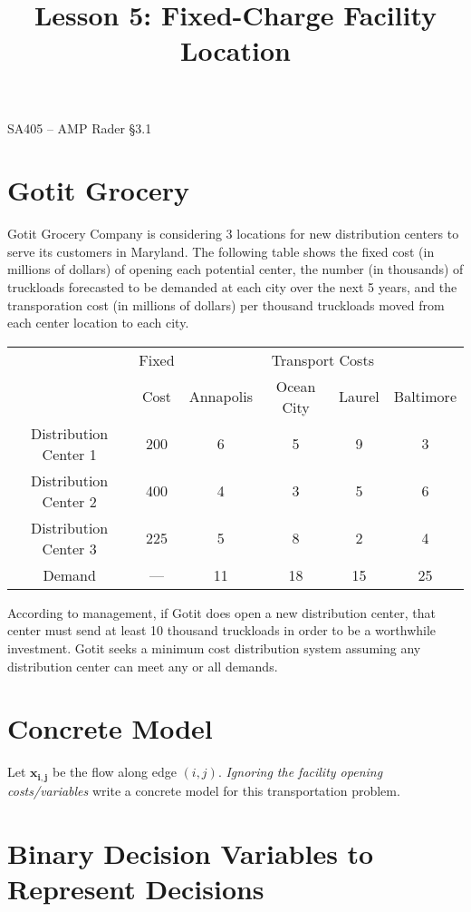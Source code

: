 \documentclass[11pt]{article}
\makeatletter
\theoremstyle{definition}
\renewcommand{\maketitle}{
  \noindent SA405 -- AMP \hfill Rader \S 3.1 \\

  \begin{center}\Large{\textbf{\@title}}\end{center}
}
\makeatother
\begin{document}
  
\title{Lesson 5: Fixed-Charge Facility Location}

\maketitle

\section{Gotit Grocery}
Gotit Grocery Company is considering 3 locations for new distribution centers to serve its customers in Maryland.  The following table shows the fixed cost (in millions of dollars) of opening each potential center, the number (in thousands) of truckloads forecasted to be demanded at each city over the next 5 years, and the transporation cost (in millions of dollars) per thousand truckloads moved from each center location to each city.  

\begin{center}
\begin{tabular}{c|c|cccc}
& Fixed & \multicolumn{4}{c}{Transport Costs} \\
& Cost & Annapolis & Ocean City & Laurel & Baltimore \\
\hline
Distribution Center 1 & 200 & 6 & 5 & 9 & 3  \\
Distribution Center 2 & 400 & 4 & 3 & 5 & 6 \\
Distribution Center 3 & 225 & 5 & 8 & 2 & 4 \\
\hline
Demand & --- & 11 & 18 & 15 & 25
\end{tabular}
\end{center}

According to management, if Gotit does open a new distribution center, that center must send at least 10 thousand truckloads in order to be a worthwhile investment. Gotit seeks a minimum cost distribution system assuming any distribution center can meet any or all demands.

\newpage

\section{Concrete Model}

Let $\mathbf{x_{i,j}}$ be the flow along edge $(i,j)$. \emph{Ignoring the facility opening costs/variables} write a concrete model for this transportation problem.

\vfill


\section{Binary Decision Variables to Represent Decisions}
\end{document}

